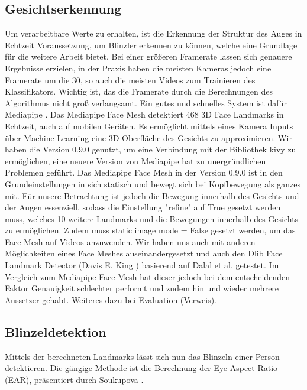 \subsection{Gesichtserkennung}
\label{sec:facedetection}
Um verarbeitbare Werte zu erhalten, ist die Erkennung der Struktur des Auges in Echtzeit Voraussetzung, 
um Blinzler erkennen zu können, welche eine Grundlage für die weitere Arbeit bietet. 
Bei einer größeren Framerate lassen sich genauere Ergebnisse erzielen, 
in der Praxis haben die meisten Kameras jedoch eine Framerate um die 30, so auch die meisten Videos zum Trainieren des Klassifikators. 
Wichtig ist, das die Framerate durch die Berechnungen des Algorithmus nicht groß verlangsamt. 
Ein gutes und schnelles System ist dafür Mediapipe \cite{LU19}. 
Das Mediapipe Face Mesh detektiert 468 3D Face Landmarks in Echtzeit, auch auf mobilen Geräten. 
Es ermöglicht mittels eines Kamera Inputs über Machine Learning eine 3D Oberfläche des Gesichts zu approximieren. 
Wir haben die Version 0.9.0 genutzt, um eine Verbindung mit der Bibliothek kivy zu ermöglichen, eine neuere Version von Mediapipe hat zu 
unergründlichen Problemen geführt. Das Mediapipe Face Mesh in der Version 0.9.0 ist in den Grundeinstellungen in sich statisch und bewegt 
sich bei Kopfbewegung als ganzes mit. Für unsere Betrachtung ist jedoch die Bewegung innerhalb des Gesichts und der Augen essenziell, 
sodass die Einstellung "refine" auf True gesetzt werden muss, welches 10 weitere Landmarks und die Bewegungen 
innerhalb des Gesichts zu ermöglichen. Zudem muss static image mode = False gesetzt werden, um das Face Mesh auf Videos anzuwenden. 
Wir haben uns auch mit anderen Möglichkeiten eines Face Meshes auseinandergesetzt und auch den Dlib Face Landmark Detector 
(Davis E. King \cite{DLIB09}) basierend auf Dalal et al. \cite{DA05} getestet. Im Vergleich zum Mediapipe Face Mesh hat dieser 
jedoch bei dem entscheidenden Faktor Genauigkeit schlechter performt und zudem hin und wieder mehrere Aussetzer gehabt. 
Weiteres dazu bei Evaluation (Verweis).

\subsection{Blinzeldetektion}
\label{sec:blinkdetection}
Mittels der berechneten Landmarks lässt sich nun das Blinzeln einer Person detektieren. Die gängige Methode ist die Berechnung der Eye Aspect Ratio (EAR), präsentiert durch Soukupova \cite{SO16}.

